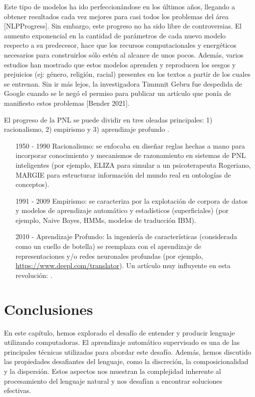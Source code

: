 Este tipo de modelos ha ido perfeccionándose en los últimos años, llegando a obtener resultados cada vez mejores para casi todos los problemas del área [NLPProgress]. Sin embargo, este progreso no ha sido libre de controversias. El  aumento exponencial en la cantidad de parámetros de cada nuevo modelo respecto a su predecesor, hace que los recursos computacionales y energéticos necesarios para construirlos sólo estén al alcance de unos pocos. Además, varios estudios han mostrado que estos modelos aprenden y reproducen los sesgos y prejuicios (ej: género, religión, racial) presentes en los textos a partir de los cuales se entrenan. Sin ir más lejos, la investigadora  Timmnit Gebru fue despedida de Google  cuando se le negó el permiso para publicar un artículo que ponía de manifiesto estos problemas [Bender 2021].


El progreso de la PNL se puede dividir en tres oleadas principales: 1) racionalismo, 2) empirismo y 3) aprendizaje profundo \cite{deng2018deep}.
\begin{itemize}
   \item [1950 - 1990] Racionalismo: se enfocaba en diseñar reglas hechas a mano para incorporar conocimiento y mecanismos de razonamiento en sistemas de PNL inteligentes (por ejemplo, ELIZA para simular a un psicoterapeuta Rogeriano, MARGIE para estructurar información del mundo real en ontologías de conceptos).
   \item [1991 - 2009] Empirismo: se caracteriza por la explotación de corpora de datos y modelos de aprendizaje automático y estadísticos (superficiales) (por ejemplo, Naive Bayes, HMMs, modelos de traducción IBM).
   \item [2010 - ] Aprendizaje Profundo: la ingeniería de características (considerada como un cuello de botella) se reemplaza con el aprendizaje de representaciones y/o redes neuronales profundas (por ejemplo, \url{https://www.deepl.com/translator}). Un artículo muy influyente en esta revolución: \cite{collobert2011natural}.
\end{itemize}


\section{Conclusiones}


En este capítulo, hemos explorado el desafío de entender y producir lenguaje utilizando computadoras. El aprendizaje automático supervisado es una de las principales técnicas utilizadas para abordar este desafío. Además, hemos discutido las propiedades desafiantes del lenguaje, como la discreción, la composicionalidad y la dispersión. Estos aspectos nos muestran la complejidad inherente al procesamiento del lenguaje natural y nos desafían a encontrar soluciones efectivas.
